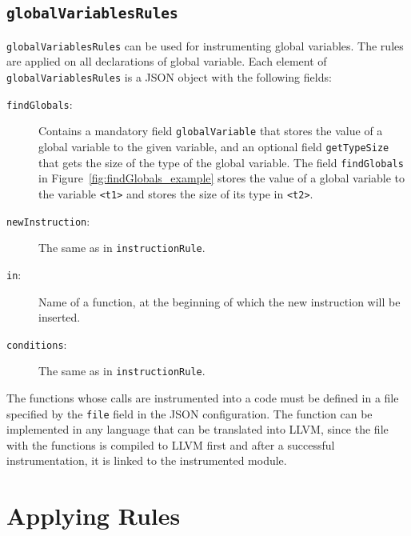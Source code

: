 \subsection{\texttt{globalVariablesRules}}

\texttt{globalVariablesRules} can be used for instrumenting global
variables. The rules are applied on all declarations of global variable. Each
element of \texttt{globalVariablesRules} is a JSON object with the following
fields:
\begin{description}
    \item[\texttt{findGlobals}:] Contains a mandatory field
    \texttt{globalVariable} that stores the value of a global variable to the
    given variable, and an optional field \texttt{getTypeSize} that gets the size
    of the type of the global variable. The field \texttt{findGlobals} in
    Figure~\ref{fig:findGlobals_example} stores the value of a global variable
    to the variable \texttt{<t1>} and stores the size of its type in
    \texttt{<t2>}.

    \begin{minipage}{\linewidth}
        
        \label{fig:findGlobals_example}
      \end{minipage}

    \item[\texttt{newInstruction}:] The same as in \texttt{instructionRule}.
    \item[\texttt{in}:] Name of a function, at the beginning of which the new
    instruction will be inserted.
    \item[\texttt{conditions}:] The same as in \texttt{instructionRule}.
\end{description}

The functions whose calls are instrumented into a code must be defined in a
file specified by the \texttt{file} field in the JSON configuration. The
function can be implemented in any language that can be translated into LLVM,
since the file with the functions is compiled to LLVM first and after a
successful instrumentation, it is linked to the instrumented module.

\section{Applying Rules}

